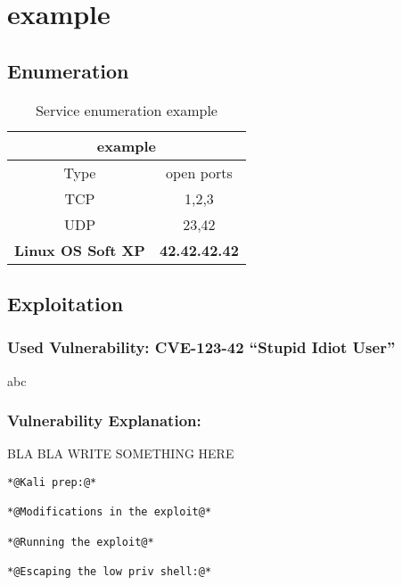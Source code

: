\renewcommand{\hostname}{example}
\renewcommand{\os}{Linux OS Soft XP}
\renewcommand{\ip}{42.42.42.42}
\renewcommand{\tcpports}{1,2,3}
\renewcommand{\udpports}{23,42}
\renewcommand{\vuln}{CVE-123-42 "`Stupid Idiot User"'}
\toggletrue{priv}

 
\section{\hostname}
\subsection{Enumeration}

	\label{tab:\hostname}
\begin{longtable}{|c|c|}
\caption{Service enumeration \hostname}\\
\hline
\multicolumn{2}{|c|}{\textbf{\hostname}}\\
\hline
\hline
Type&open ports\\
\hline
TCP&\tcpports{}\\
\hline
UDP&\udpports{}\\

\hline
\hline
\multicolumn{1}{|c|}{\textbf{\os}}&\multicolumn{1}{|c|}{\textbf{\ip}}\\
\hline


\end{longtable}
\subsection{Exploitation}

\subsubsection{Used Vulnerability: \vuln}
abc
\subsubsection{Vulnerability Explanation:}
BLA BLA WRITE SOMETHING HERE 


\begin{lstlisting}[caption={Exploitation of \hostname},label=\hostname-exploit]
*@Kali prep:@*

*@Modifications in the exploit@*

*@Running the exploit@*

*@Escaping the low priv shell:@*
\end{lstlisting}


